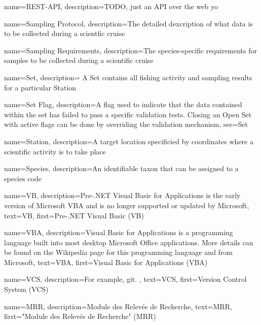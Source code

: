 {
  name=REST-API,
  description={TODO, just an API over the web yo}
}

 {
  name=Sampling Protocol,
  description={The detailed dexcription of what data is to be collected during a scientfic cruise}
}

 {
  name=Sampling Requirements,
  description={The species-specific requirements for samples to be collected during a scientific cruise}
}

 {
  name=Set,
  description={
    A Set contains all fishing activity and sampling results for a particular \gls{Station}
  }
}

 {
  name=Set Flag,
  description={A flag used to indicate that the data contained within the set has failed to pass a specific validation tests.
  Closing an \gls{Open Set} with active flags can be done by overriding the validation mechanism},
  see=\gls{Set}
  }

 {
  name=Station,
  description={A target location specificied by coordinates where a scientific activity is to take place}
}

 {
  name=Species,
  description={An identifiable taxon that can be assigned to a species code}
}

 {
  name=VB,
  description={Pre-.NET Visual Basic for Applications is the early version of Microsoft VBA and is no longer supported or updated by Microsoft},
  text={VB},
  first={Pre-.NET Visual Basic (VB)}
}

 {
  name=VBA,
  description={Visual Basic for Applications is a programming language built into most desktop Microsoft Office applications. More details can be found on the Wikipedia page for this programming language and from Microsoft},
  text={VBA},
  first={Visual Basic for Applications (VBA)}
}

 {
  name=VCS,
  description={For example, git. },
  text={VCS},
  first={Version Control System (VCS)}
}


 {
  name=MRR,
  description={Module des Relevés de Recherche},
  text={MRR},
  first={"Module des Relevés de Recherche" (MRR)}
}


\glsaddall
\glsaddallunused


